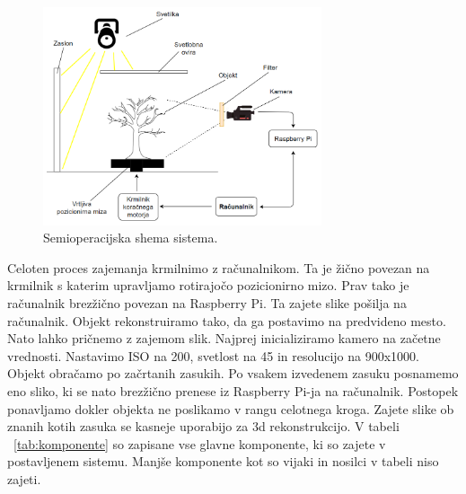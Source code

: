 \documentclass[journal,a4paper,twoside]{sty/IEEEtran}
\begin{document}
\begin{figure}[H]
	\centerline{\includegraphics[width=8.2cm]{fig/blokovna_sistem}}
	\caption{Semioperacijska shema sistema.}
	\label{fig:blokovna}
\end{figure}
%
 Celoten proces zajemanja krmilnimo z računalnikom. Ta je žično povezan na krmilnik s katerim upravljamo rotirajočo pozicionirno mizo. Prav tako je računalnik brezžično povezan na Raspberry Pi. Ta zajete slike pošilja na računalnik. Objekt rekonstruiramo tako, da ga postavimo na predvideno mesto. Nato lahko pričnemo z zajemom slik. Najprej inicializiramo kamero na začetne vrednosti. Nastavimo ISO na 200, svetlost na 45 in resolucijo na 900x1000.  Objekt obračamo po začrtanih zasukih. Po vsakem izvedenem zasuku posnamemo eno sliko, ki se nato brezžično prenese iz Raspberry Pi-ja na računalnik. Postopek ponavljamo dokler objekta ne poslikamo v rangu celotnega kroga. Zajete slike ob znanih kotih zasuka se kasneje uporabijo za 3d rekonstrukcijo. V tabeli ~\ref{tab:komponente} so zapisane vse glavne komponente, ki so zajete v postavljenem sistemu. Manjše komponente kot so vijaki in nosilci v tabeli niso zajeti.
\end{document}
